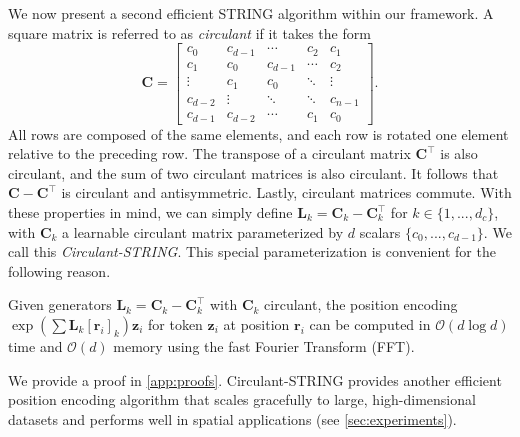 We now present a second efficient STRING algorithm within our framework.
A square matrix is referred to as \emph{circulant} if it takes the form 
\begin{equation} \label{eq:circulant_string}
    \mathbf{C} =
\begin{bmatrix}
c_0 & c_{d-1} & \cdots & c_2 & c_1 \\
c_1 & c_0 & c_{d-1} & \cdots & c_2 \\
\vdots & c_1 & c_0 & \ddots & \vdots \\
c_{d-2} & \vdots & \ddots & \ddots & c_{n-1} \\
c_{d-1} & c_{d-2} & \cdots & c_1 & c_0
\end{bmatrix}.
\end{equation}
All rows are composed of the same elements, and each row is rotated one element relative to the preceding row.
The transpose of a circulant matrix $\mathbf{C}^\top$ is also circulant, and the sum of two circulant matrices is also circulant.
It follows that $\mathbf{C}-\mathbf{C}^\top$ is circulant and antisymmetric.
Lastly, circulant matrices commute.
With these properties in mind, we can simply define $\mathbf{L}_k=\mathbf{C}_k - \mathbf{C}_k^\top$ for $k\in\{1,...,d_c\}$, with $\mathbf{C}_k$ a learnable circulant matrix parameterized by $d$ scalars $\{c_0,...,c_{d-1}\}$.
We call this \emph{Circulant-STRING}. 
This special parameterization is convenient for the following reason. 
\newpage

\begin{theorem} \label{thm:circ-string-fast}
Given generators $\mathbf{L}_k=\mathbf{C}_k - \mathbf{C}_k^\top$ with $\mathbf{C}_k$ circulant, the position encoding $\exp(\sum \mathbf{L}_k [\mathbf{r}_i]_k)\mathbf{z}_i$ for token $\mathbf{z}_i$ at position $\mathbf{r}_i$ can be computed in $\mathcal{O}(d \log d)$ time and $\mathcal{O}(d)$ memory using the fast Fourier Transform (FFT).
\end{theorem}
We provide a proof in \cref{app:proofs}. 
Circulant-STRING provides another efficient position encoding algorithm that scales gracefully to large, high-dimensional datasets and performs well in spatial applications (see \cref{sec:experiments}). 






















